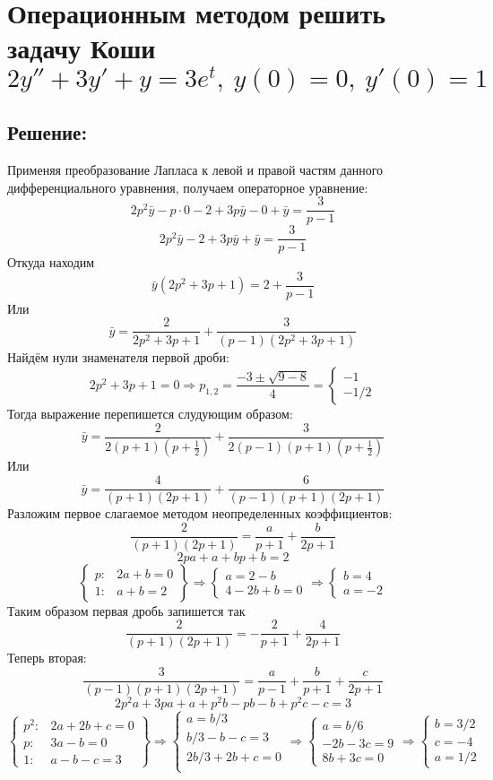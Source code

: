 \documentclass{article}
\begin{document}
	\section{Операционным методом решить задачу Коши $2y'' + 3y' + y = 3e^t, \ y(0) = 0, \ y'(0)=1$}
	\subsection{Решение:}
	Применяя преобразование Лапласа к левой и правой частям данного дифференциального уравнения, получаем операторное уравнение:
	\[2p^2\bar{y}  - p\cdot 0 - 2 + 3p\bar{y} - 0 + \bar{y} = \frac{3}{p-1}\]
	\[2p^2\bar{y} - 2 + 3p\bar{y} + \bar{y} = \frac{3}{p-1}\]
	Откуда находим
	\[\bar{y}(2p^2 + 3p +1) = 2  +\frac{3}{p-1}\]
	Или
	\[\bar{y} = \frac{2}{2p^2 + 3p +1} + \frac{3}{(p-1)(2p^2 + 3p +1)}\]
	Найдём нули знаменателя первой дроби:
	\[2p^2 + 3p + 1 = 0 \Rightarrow p_{1,2} = \frac{-3 \pm \sqrt{9 - 8}}{4} = \begin{cases}
		-1\\
		-1/2
	\end{cases}\]
	Тогда выражение перепишется слудующим образом:
	\[\bar{y} = \frac{2}{2(p+1)(p+\frac{1}{2}) }+ \frac{3}{2(p-1)(p+1)(p+\frac{1}{2})}\]
	Или
	\[\bar{y} = \frac{4}{(p+1)(2p+1) }+ \frac{6}{(p-1)(p+1)(2p+1)}\]
	Разложим первое слагаемое методом неопределенных коэффициентов:
	\[\frac{2}{(p+1)(2p+1)} = \frac{a}{p+1} + \frac{b}{2p+1}\]
	\[2pa + a + bp + b = 2\]
	\[\begin{Bmatrix}
		p: & 2a + b = 0\\
		1: & a + b = 2
	\end{Bmatrix}\Rightarrow \begin{cases}
	a = 2 - b \\
	4 - 2b + b = 0
	\end{cases}\Rightarrow\begin{cases}
	b = 4 \\
	a = -2
	
	\end{cases}\]
	Таким образом первая дробь запишется так
	\[\frac{2}{(p+1)(2p+1)} = -\frac{2}{p+1} + \frac{4}{2p+1}\]
	Теперь вторая:
	\[\frac{3}{(p-1)(p+1)(2p+1)} = \frac{a}{p-1} + \frac{b}{p+1} + \frac{c}{2p+1}\]
	\[2p^2a + 3pa + a +p^2 b - pb - b + p^2c - c = 3\]
	\[\begin{Bmatrix}
		p^2: & 2a + 2b + c = 0\\
		p: & 3a - b = 0\\
		1: & a - b - c = 3
	\end{Bmatrix}\Rightarrow \begin{cases}
	a = b/3\\
	b/3 - b - c = 3\\
	2b/3 + 2b + c = 0\\
	
	\end{cases} \Rightarrow \begin{cases}
	a = b/6\\
	-2b - 3c = 9\\
	8b +3c= 0
	\end{cases}\Rightarrow \begin{cases}
	b = 3/2\\
	c = -4\\
	a = 1/2
	\end{cases}\]
\end{document}
